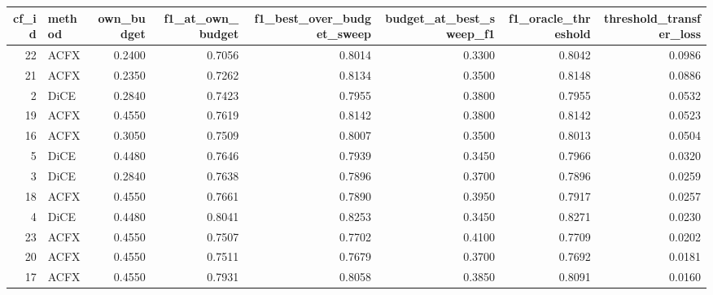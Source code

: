 \begin{tabular}{rlrrrrrr}
\toprule
 cf\_id & method &  own\_budget &  f1\_at\_own\_budget &  f1\_best\_over\_budget\_sweep &  budget\_at\_best\_sweep\_f1 &  f1\_oracle\_threshold &  threshold\_transfer\_loss \\
\midrule
    22 &   ACFX &      0.2400 &            0.7056 &                     0.8014 &                   0.3300 &               0.8042 &                   0.0986 \\
    21 &   ACFX &      0.2350 &            0.7262 &                     0.8134 &                   0.3500 &               0.8148 &                   0.0886 \\
     2 &   DiCE &      0.2840 &            0.7423 &                     0.7955 &                   0.3800 &               0.7955 &                   0.0532 \\
    19 &   ACFX &      0.4550 &            0.7619 &                     0.8142 &                   0.3800 &               0.8142 &                   0.0523 \\
    16 &   ACFX &      0.3050 &            0.7509 &                     0.8007 &                   0.3500 &               0.8013 &                   0.0504 \\
     5 &   DiCE &      0.4480 &            0.7646 &                     0.7939 &                   0.3450 &               0.7966 &                   0.0320 \\
     3 &   DiCE &      0.2840 &            0.7638 &                     0.7896 &                   0.3700 &               0.7896 &                   0.0259 \\
    18 &   ACFX &      0.4550 &            0.7661 &                     0.7890 &                   0.3950 &               0.7917 &                   0.0257 \\
     4 &   DiCE &      0.4480 &            0.8041 &                     0.8253 &                   0.3450 &               0.8271 &                   0.0230 \\
    23 &   ACFX &      0.4550 &            0.7507 &                     0.7702 &                   0.4100 &               0.7709 &                   0.0202 \\
    20 &   ACFX &      0.4550 &            0.7511 &                     0.7679 &                   0.3700 &               0.7692 &                   0.0181 \\
    17 &   ACFX &      0.4550 &            0.7931 &                     0.8058 &                   0.3850 &               0.8091 &                   0.0160 \\

\end{tabular}
